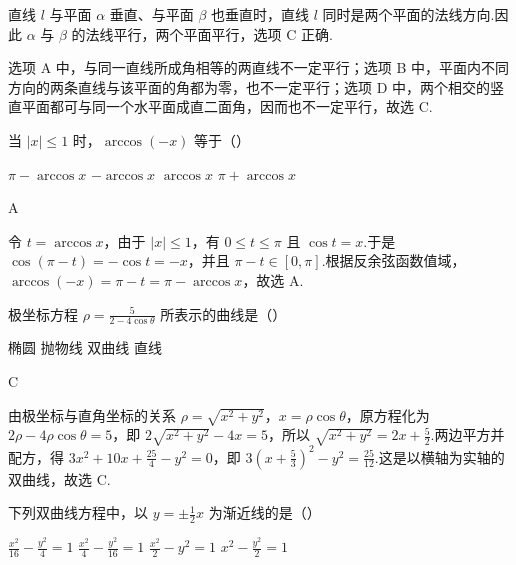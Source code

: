 \begin{solution}
直线 \(l\) 与平面 \(\alpha\) 垂直、与平面 \(\beta\) 也垂直时，直线 \(l\) 同时是两个平面的法线方向.因此 \(\alpha\) 与 \(\beta\) 的法线平行，两个平面平行，选项 C 正确.

选项 A 中，与同一直线所成角相等的两直线不一定平行；选项 B 中，平面内不同方向的两条直线与该平面的角都为零，也不一定平行；选项 D 中，两个相交的竖直平面都可与同一个水平面成直二面角，因而也不一定平行，故选 C.
\end{solution}

\begin{problem}

当 \(|x|\leqslant 1\) 时，\(\arccos(-x)\) 等于（\quad）

\choices
    {\(\pi-\arccos x\)}
    {\(-\arccos x\)}
    {\(\arccos x\)}
    {\(\pi+\arccos x\)}
\end{problem}

\begin{answer}
A
\end{answer}

\begin{solution}
令 \(t=\arccos x\)，由于 \(|x|\leqslant1\)，有 \(0\leqslant t\leqslant\pi\) 且 \(\cos t=x\).于是
\(\cos(\pi-t)=-\cos t=-x\)，并且 \(\pi-t\in[0,\pi]\).根据反余弦函数值域，
\(\arccos(-x)=\pi-t=\pi-\arccos x\)，故选 A.
\end{solution}

\begin{problem}

极坐标方程 \(\rho=\frac{5}{2-4\cos\theta}\) 所表示的曲线是（\quad）

\choices
    {椭圆}
    {抛物线}
    {双曲线}
    {直线}
\end{problem}

\begin{answer}
C
\end{answer}

\begin{solution}
由极坐标与直角坐标的关系 \(\rho=\sqrt{x^2+y^2}\)，\(x=\rho\cos\theta\)，原方程化为
\(2\rho-4\rho\cos\theta=5\)，即
\(2\sqrt{x^2+y^2}-4x=5\)，所以
\(\sqrt{x^2+y^2}=2x+\frac{5}{2}\).两边平方并配方，得
\(3x^2+10x+\frac{25}{4}-y^2=0\)，即
\(3\left(x+\frac{5}{3}\right)^2-y^2=\frac{25}{12}\).这是以横轴为实轴的双曲线，故选 C.
\end{solution}

\begin{problem}

下列双曲线方程中，以 \(y=\pm \frac{1}{2}x\) 为渐近线的是（\quad）

\choices
    {\(\frac{x^2}{16}-\frac{y^2}{4}=1\)}
    {\(\frac{x^2}{4}-\frac{y^2}{16}=1\)}
    {\(\frac{x^2}{2}-y^2=1\)}
    {\(x^2-\frac{y^2}{2}=1\)}
\end{problem}

